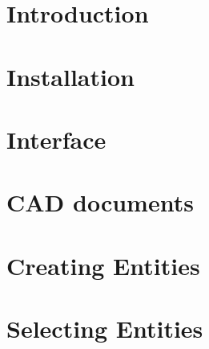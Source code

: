 \documentclass[12pt]{article}
\begin{document}
\begin{screen}
\ppttitle
\end{screen}
\footskip 0.7cm
\newpage


\newpage
\section{Introduction}

\newpage
\section{Installation}

\newpage
\section{Interface}

\newpage
\section{CAD documents}

\newpage
\section{Creating Entities}

\section{Selecting Entities}

\end{document}
